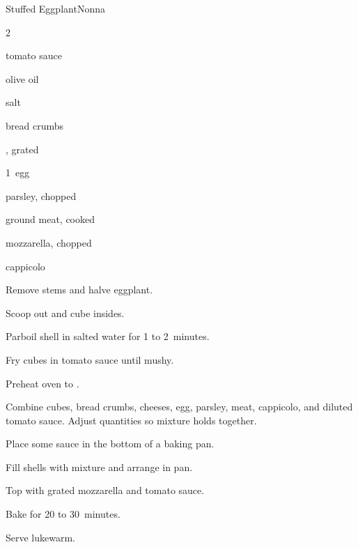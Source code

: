 \begin{recipe}{Stuffed Eggplant}{Nonna}{}

\begin{ingredients}
\item 2~
\item tomato sauce
\item olive oil
\item salt
\item bread crumbs
\item {}, grated
\item 1~egg
\item parsley, chopped
\item ground meat, cooked
\item mozzarella, chopped
\item cappicolo
\end{ingredients}

\begin{directions}
\item Remove stems and halve eggplant.
\item Scoop out and cube insides.
\item Parboil shell in salted water for 1 to 2~minutes.
\item Fry cubes in tomato sauce until mushy.
\item Preheat oven to .
\item Combine cubes, bread crumbs, cheeses, egg, parsley, meat, cappicolo, and diluted tomato sauce. Adjust quantities so mixture holds together.
\item Place some sauce in the bottom of a baking pan.
\item Fill shells with mixture and arrange in pan.
\item Top with grated mozzarella and tomato sauce.
\item Bake for 20 to 30~minutes.
\item Serve lukewarm.
\end{directions}

\end{recipe}
